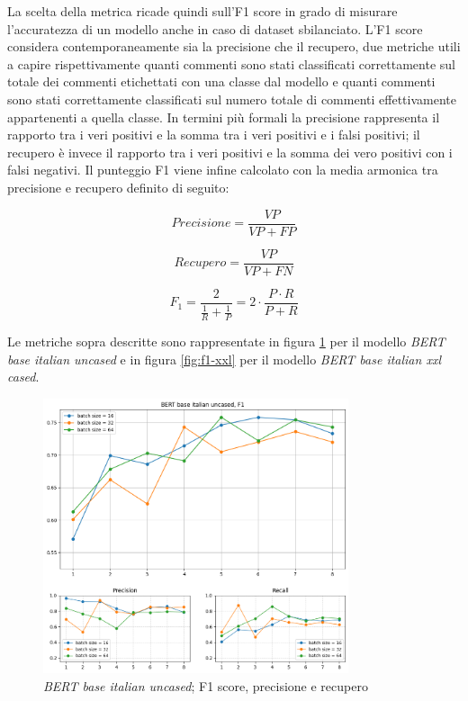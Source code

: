     La scelta della metrica ricade quindi sull'F1 score in grado di misurare l'accuratezza di un modello anche in caso di dataset sbilanciato. L'F1 score considera contemporaneamente sia la precisione che il recupero, due metriche utili a capire rispettivamente quanti commenti sono stati classificati correttamente sul totale dei commenti etichettati con una classe dal modello e quanti commenti sono stati correttamente classificati sul numero totale di commenti effettivamente appartenenti a quella classe. In termini più formali la precisione rappresenta il rapporto tra i veri positivi e la somma tra i veri positivi e i falsi positivi; il recupero è invece il rapporto tra i veri positivi e la somma dei vero positivi con i falsi negativi. Il punteggio F1 viene infine calcolato con la media armonica tra precisione e recupero definito di seguito:
    
    \[Precisione = \frac{VP}{VP + FP}\]
    
    \[Recupero = \frac{VP}{VP + FN}\]
    
    \[F_{1} = \frac{2}{\frac{1}{R} + \frac{1}{P}} = 2 \cdot \frac{P \cdot R}{P + R}\]
    
    Le metriche sopra descritte sono rappresentate in figura \ref{fig:f1-uncased} per il modello \textit{BERT base italian uncased} e in figura \ref{fig:f1-xxl} per il modello \textit{BERT base italian xxl cased}.

    \begin{figure}[h]
        \centering
        \includegraphics[width=0.8\textwidth]{pics/bert base italian uncased/f1 precision recall.png}
        \caption{\textit{BERT base italian uncased}; F1 score, precisione e recupero}
        \label{fig:f1-uncased}
    \end{figure}
    
